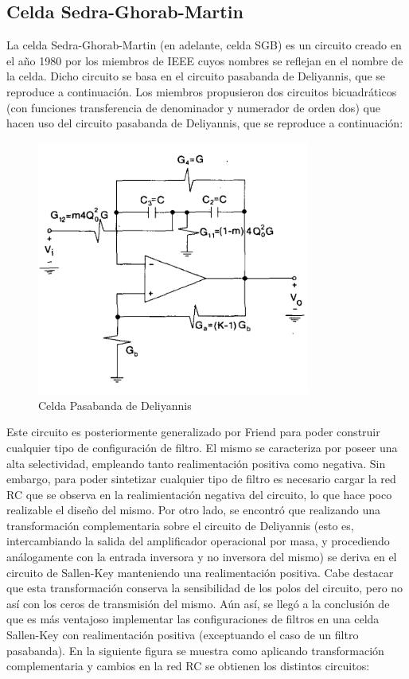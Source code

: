 \subsection{Celda Sedra-Ghorab-Martin}

La celda Sedra-Ghorab-Martin (en adelante, celda SGB) es un circuito creado en el año 1980 por los miembros de IEEE cuyos nombres se reflejan en el nombre de la celda. Dicho circuito se basa en el circuito pasabanda de Deliyannis, que se reproduce a continuación. Los miembros propusieron dos circuitos bicuadráticos (con funciones transferencia de denominador y numerador de orden dos) que hacen uso del circuito pasabanda de Deliyannis, que se reproduce a continuación:

\begin{figure}[h]
	\includegraphics[width=0.8\textwidth]{../Ejercicio2-DisenoDeCeldas/3CeldaSedra/Imagenes/Celda Deliyannis.png}
	\centering
	\caption{Celda Pasabanda de Deliyannis}
	\label{Deliyannis pasabanda}
\end{figure}

Este circuito es posteriormente generalizado por Friend para poder construir cualquier tipo de configuración de filtro. El mismo se caracteriza por poseer una alta selectividad, empleando tanto realimentación positiva como negativa. Sin embargo, para poder sintetizar cualquier tipo de filtro es necesario cargar la red RC que se observa en la realimientación negativa del circuito, lo que hace poco realizable el diseño del mismo. Por otro lado, se encontró que realizando una transformación complementaria sobre el circuito de Deliyannis (esto es, intercambiando la salida del amplificador operacional por masa, y procediendo análogamente con la entrada inversora y no inversora del mismo) se deriva en el circuito de Sallen-Key manteniendo una realimentación positiva. Cabe destacar que esta transformación conserva la sensibilidad de los polos del circuito, pero no así con los ceros de transmisión del mismo. Aún así, se llegó a la conclusión de que es más ventajoso implementar las configuraciones de filtros en una celda Sallen-Key con realimentación positiva (exceptuando el caso de un filtro pasabanda).
En la siguiente figura se muestra como aplicando transformación complementaria y cambios en la red RC se obtienen los distintos circuitos:

